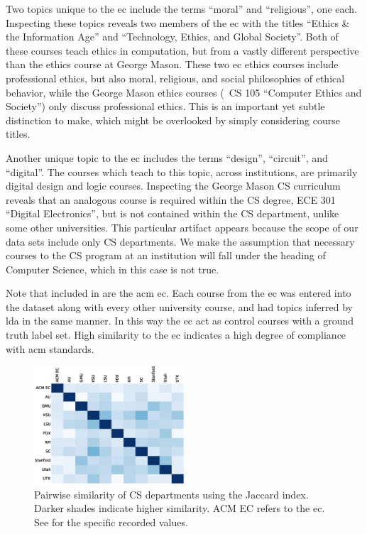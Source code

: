 
Two topics unique to the \ac{ec} include the terms ``moral'' and ``religious'', one each.
Inspecting these topics reveals two members of the \ac{ec} with the titles ``Ethics \& the Information Age'' and ``Technology, Ethics, and Global Society''.
Both of these courses teach ethics in computation, but from a vastly different perspective than the ethics course at George Mason.
These two \ac{ec} ethics courses include professional ethics, but also moral, religious, and social philosophies of ethical behavior, while the George Mason ethics courses (\eg\ CS 105 ``Computer Ethics and Society'') only discuss professional ethics.
This is an important yet subtle distinction to make, which might be overlooked by simply considering course titles.


Another unique topic to the \ac{ec} includes the terms ``design'', ``circuit'', and ``digital''.
The courses which teach to this topic, across institutions, are primarily digital design and logic courses.
Inspecting the George Mason CS curriculum reveals that an analogous course is required within the CS degree, ECE 301 ``Digital Electronics'', but is not contained within the CS department, unlike some other universities.
This particular artifact appears because the scope of our data sets include only CS departments.
We make the assumption that necessary courses to the CS program at an institution will fall under the heading of Computer Science, which in this case is not true.


Note that included in  are the \ac{acm} \ac{ec}.
Each course from the \ac{ec} was entered into the dataset along with every other university course, and had topics inferred by \ac{lda} in the same manner.
In this way the \ac{ec} act as control courses with a ground truth label set.
High similarity to the \ac{ec} indicates a high degree of compliance with \ac{acm} standards.


\begin{figure}
  \includegraphics[width=0.5\textwidth]{figures/10by10heatmap}
  \caption{Pairwise similarity of CS departments using the Jaccard index. Darker shades indicate higher similarity. ACM EC refers to the \acf{ec}. See  for the specific recorded values.\label{fig:heatmap}}
\end{figure}

